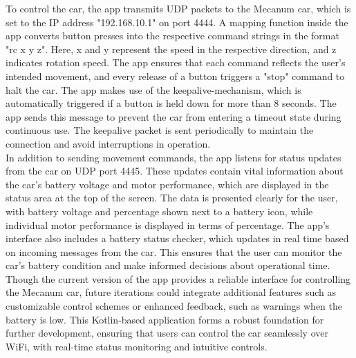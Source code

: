 To control the car, the app transmits UDP packets to the Mecanum car, which is set to the IP address "192.168.10.1" on port 4444. A mapping function inside the app converts button presses into the respective command strings in the format "rc x y z". Here, x and y represent the speed in the respective direction, and z indicates rotation speed. The app ensures that each command reflects the user's intended movement, and every release of a button triggers a "stop" command to halt the car.
The app makes use of the keepalive-mechanism, which is automatically triggered if a button is held down for more than 8 seconds. The app sends this message to prevent the car from entering a timeout state during continuous use. The keepalive packet is sent periodically to maintain the connection and avoid interruptions in operation.\\
In addition to sending movement commands, the app listens for status updates from the car on UDP port 4445. These updates contain vital information about the car’s battery voltage and motor performance, which are displayed in the status area at the top of the screen. The data is presented clearly for the user, with battery voltage and percentage shown next to a battery icon, while individual motor performance is displayed in terms of percentage. The app’s interface also includes a battery status checker, which updates in real time based on incoming messages from the car. This ensures that the user can monitor the car’s battery condition and make informed decisions about operational time.\\
Though the current version of the app provides a reliable interface for controlling the Mecanum car, future iterations could integrate additional features such as customizable control schemes or enhanced feedback, such as warnings when the battery is low.
This Kotlin-based application forms a robust foundation for further development, ensuring that users can control the car seamlessly over WiFi, with real-time status monitoring and intuitive controls.